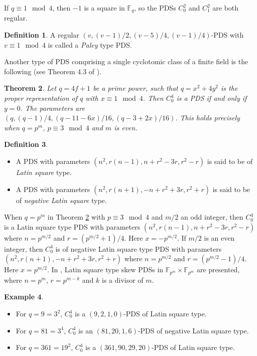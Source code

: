 \documentclass[12pt, a4paper]{article}
\newtheorem{theorem}{Theorem}[section]
\theoremstyle{definition}
\newtheorem{example}[theorem]{Example}
\newtheorem{definition}[theorem]{Definition}
\begin{document}
If $q \equiv 1 \mod 4$, then $-1$ is a square in $\mathbb{F}_q$, so the PDSs $C_0^2$ and $C_1^2$ are both regular.  

\begin{definition}
A regular $(v,(v-1)/2,(v-5)/4,(v-1)/4)$-PDS with $v \equiv 1 \mod 4$ is called a \emph{Paley} type PDS.
\end{definition}

Another type of PDS comprising a single cyclotomic class of a finite field is the following (see Theorem 4.3 of \cite{HucJoh}).

\begin{theorem}\label{thm:C_0^4PDS}
Let $q=4f+1$ be a prime power, such that $q=x^2+4y^2$ is the proper representation of $q$ with $x \equiv 1 \mod 4$.  Then $C_0^4$ is a PDS if and only if $y=0$.
The parameters are $(q,(q-1)/4,(q-11-6x)/16,(q-3+2x)/16)$.
This holds precisely when $q=p^m$, $p \equiv 3 \mod 4$ and $m$ is even.
\end{theorem}

\begin{definition}
\begin{itemize}
\item[(i)] A PDS with parameters $(n^2,r(n-1),n+r^2-3r,r^2-r)$ is said to be of \emph{Latin square} type.
\item[(ii)] A PDS with parameters $(n^2,r(n+1),-n+r^2+3r, r^2+r)$ is said to be of \emph{negative Latin square} type. 
\end{itemize}
\end{definition}

When $q=p^m$ in Theorem \ref{thm:C_0^4PDS} with $p \equiv 3 \mod 4$ and $m/2$ an odd integer, then $C_0^4$ is a Latin square type PDS with parameters $(n^2,r(n-1),n+r^2-3r,r^2-r)$ where $n=p^{m/2}$ and  $r=(p^{m/2}+1)/4$.  Here $x=-p^{m/2}$.
If $m/2$ is an even integer, then $C_0^4$ is of negative Latin square type PDS with parameters $(n^2,r(n+1),-n+r^2+3r, r^2+r)$ where $n=p^{m/2}$ and  $r=(p^{m/2}-1)/4$.  Here $x=p^{m/2}$.  In \cite{AnbKalMei}, Latin square type skew PDSs in $\mathbb{F}_{p^m} \times \mathbb{F}_{p^m}$ are presented, where $n=p^m$, $r=p^{m-k}$ and $k$ is a divisor of  $m$.

\begin{example}
\begin{itemize}
\item[(i)] For $q=9=3^2$, $C_0^4$ is a $(9,2,1,0)$-PDS of Latin square type.
\item[(ii)] For $q=81=3^4$, $C_0^4$ is an $(81,20,1,6)$-PDS of negative Latin square type.
\item[(iii)] For $q=361=19^2$, $C_0^4$ is a $(361,90,29,20)$-PDS of Latin square type.
\end{itemize}
\end{example}
\end{document}
